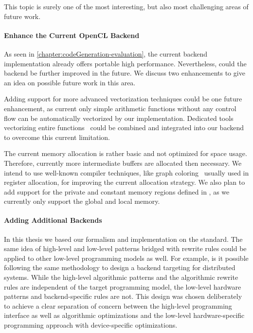 \bigskip
This topic is surely one of the most interesting, but also most challenging areas of future work.

\paragraph{Enhance the Current OpenCL Backend}
As seen in \autoref{chapter:codeGeneration-evaluation}, the current \OpenCL backend implementation already offers portable high performance.
Nevertheless, could the backend be further improved in the future.
We discuss two enhancements to give an idea on possible future work in this area.

Adding support for more advanced vectorization techniques could be one future enhancement, as current only simple arithmetic functions without any control flow can be automatically vectorized by our implementation.
Dedicated tools vectorizing entire functions~\cite{KarrenbergHa2011} could be combined and integrated into our backend to overcome this current limitation.

The current memory allocation is rather basic and not optimized for space usage.
Therefore, currently more intermediate buffers are allocated then necessary.
We intend to use well-known compiler techniques, like graph coloring~\cite{Muchnick1997} usually used in register allocation, for improving the current allocation strategy.
We also plan to add support for the private and constant memory regions defined in \OpenCL, as we currently only support the global and local memory.

\paragraph{Adding Additional Backends}
In this thesis we based our formalism and implementation on the \OpenCL standard.
The same idea of high-level and low-level patterns bridged with rewrite rules could be applied to other low-level programming models as well.
For example, is it possible following the same methodology to design a backend targeting \MPI for distributed systems.
While the high-level algorithmic patterns and the algorithmic rewrite rules are independent of the target programming model, the low-level hardware patterns and  backend-specific rules are not.
This design was chosen deliberately to achieve a clear separation of concern between the high-level programming interface as well as algorithmic optimizations and the low-level hardware-specific programming approach with device-specific optimizations.

